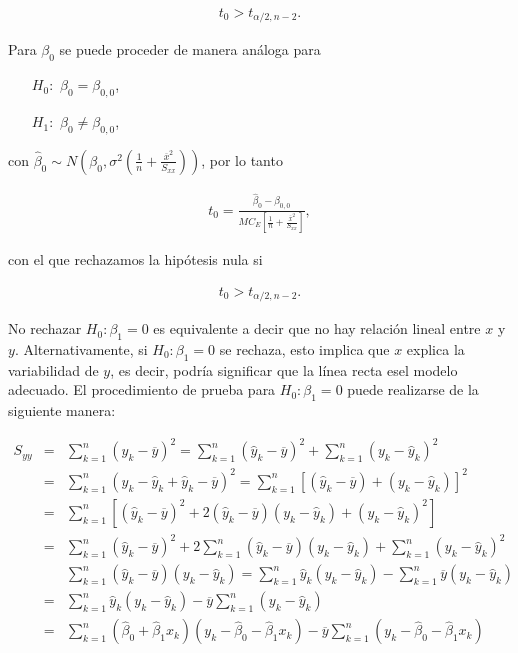 \documentclass[12pt]{article}
\begin{document}
\begin{eqnarray*}%
t_{0}>t_{\alpha/2,n-2}.
\end{eqnarray*}


Para $\beta_{0}$ se puede proceder de manera an\'aloga para
\begin{itemize}
\item[$H_{0}:$] $\beta_{0}=\beta_{0,0}$,
\item[$H_{1}:$] $\beta_{0}\neq\beta_{0,0}$,
\end{itemize}
con $\hat{\beta}_{0}\sim N\left(\beta_{0},\sigma^{2}\left(\frac{1}{n}+\frac{\overline{x}^{2}}{S_{xx}}\right)\right)$, por lo tanto

\begin{eqnarray*}%
t_{0}=\frac{\hat{\beta}_{0}-\beta_{0,0}}{MC_{E}\left[\frac{1}{n}+\frac{\overline{x}^{2}}{S_{xx}}\right]},
\end{eqnarray*}

con el que rechazamos la hip\'otesis nula si

\begin{eqnarray*}%
t_{0}>t_{\alpha/2,n-2}.
\end{eqnarray*}

No rechazar $H_{0}:\beta_{1}=0$ es equivalente a decir que no hay relaci\'on lineal entre $x$ y $y$. Alternativamente, si $H_{0}:\beta_{1}=0$ se rechaza, esto implica que $x$ explica la variabilidad de $y$, es decir, podr\'ia significar que la l\'inea recta esel modelo adecuado. El procedimiento de prueba para $H_{0}:\beta_{1}=0$ puede realizarse de la siguiente manera:

\begin{eqnarray*}
S_{yy}&=&\sum_{k=1}^{n}\left(y_{k}-\overline{y}\right)^{2}=\sum_{k=1}^{n}\left(\hat{y}_{k}-\overline{y}\right)^{2}+\sum_{k=1}^{n}\left(y_{k}-\hat{y}_{k}\right)^{2}\\
&=&\sum_{k=1}^{n}\left(y_{k}-\hat{y}_{k}+\hat{y}_{k}-\overline{y}\right)^{2}=\sum_{k=1}^{n}\left[\left(\hat{y}_{k}-\overline{y}\right)+\left(y_{k}-\hat{y}_{k}\right)\right]^{2}\\
&=&\sum_{k=1}^{n}\left[\left(\hat{y}_{k}-\overline{y}\right)^{2}+2\left(\hat{y}_{k}-\overline{y}\right)\left(y_{k}-\hat{y}_{k}\right)+\left(y_{k}-\hat{y}_{k}\right)^{2}\right]\\
&=&\sum_{k=1}^{n}\left(\hat{y}_{k}-\overline{y}\right)^{2}+2\sum_{k=1}^{n}\left(\hat{y}_{k}-\overline{y}\right)\left(y_{k}-\hat{y}_{k}\right)+\sum_{k=1}^{n}\left(y_{k}-\hat{y}_{k}\right)^{2}\\
&&\sum_{k=1}^{n}\left(\hat{y}_{k}-\overline{y}\right)\left(y_{k}-\hat{y}_{k}\right)=\sum_{k=1}^{n}\hat{y}_{k}\left(y_{k}-\hat{y}_{k}\right)-\sum_{k=1}^{n}\overline{y}\left(y_{k}-\hat{y}_{k}\right)\\
&=&\sum_{k=1}^{n}\hat{y}_{k}\left(y_{k}-\hat{y}_{k}\right)-\overline{y}\sum_{k=1}^{n}\left(y_{k}-\hat{y}_{k}\right)\\
&=&\sum_{k=1}^{n}\left(\hat{\beta}_{0}+\hat{\beta}_{1}x_{k}\right)\left(y_{k}-\hat{\beta}_{0}-\hat{\beta}_{1}x_{k}\right)-\overline{y}\sum_{k=1}^{n}\left(y_{k}-\hat{\beta}_{0}-\hat{\beta}_{1}x_{k}\right)\\
\end{eqnarray*}
\end{document}
